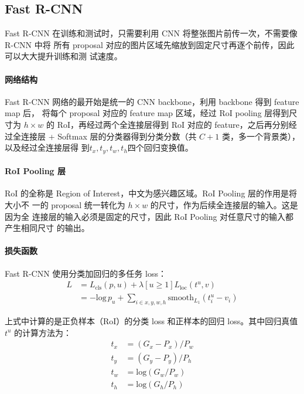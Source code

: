 \subsection{Fast R-CNN}
\label{subsec:Fast-R-CNN}

Fast R-CNN 在训练和测试时，只需要利用 CNN 将整张图片前传一次，不需要像 R-CNN 中将
所有 proposal 对应的图片区域先缩放到固定尺寸再逐个前传，因此可以大大提升训练和测
试速度。

\paragraph{网络结构}
Fast R-CNN 网络的最开始是统一的 CNN backbone，利用 backbone 得到 feature map 后，
将每个 proposal 对应的 feature map 区域，经过 RoI pooling 层得到尺寸为 $h \times
w$ 的 RoI，再经过两个全连接层得到 RoI 对应的 feature，之后再分别经过全连接层 +
Softmax 层的分类器得到分类分数（共 $C+1$ 类，多一个背景类），以及经过全连接层得
到$t_x, t_y, t_w, t_h$四个回归变换值。

\paragraph{RoI Pooling 层}
RoI 的全称是 Region of Interest，中文为感兴趣区域。RoI Pooling 层的作用是将大小不
一的 proposal 统一转化为 $h \times w$ 的尺寸，作为后续全连接层的输入。这是因为全
连接层的输入必须是固定的尺寸，因此 RoI Pooling 对任意尺寸的输入都产生相同尺寸
的输出。

\paragraph{损失函数}
Fast R-CNN 使用分类加回归的多任务 loss：
\begin{align}
  L & = L_{\mathrm{cls}}(p, u) + \lambda [u \geq 1] L_{\mathrm{loc}}(t^u, v) \\
    & = -\mathrm{log}\,p_u + \sum_{i \in {x, y, w, h}} \mathrm{smooth}_{L_1}(t_i^u - v_i)
\end{align}

上式中计算的是正负样本（RoI）的分类 loss 和正样本的回归 loss。其中回归真值 $t^u$
的计算方法为：
\begin{align}
  t_x & = (G_x - P_x) / P_w \\
  t_y & = (G_y - P_y) / P_h \\
  t_w & = \mathrm{log} (G_w/P_w) \\
  t_h & = \mathrm{log} (G_h/P_h)
\end{align}

